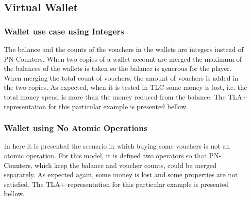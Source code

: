 \subsection{Virtual Wallet}\label{use_case_virtual_wallet}



\subsubsection{Wallet use case using Integers}
The balance and the counts of the vouchers in the wallets are integers instead of PN-Counters. When two copies of a wallet account are merged the maximum of the balances of the wallets is taken so the balance is generous for the player. When merging the total count of vouchers, the amount of vouchers is added in the two copies. As expected, when it is tested in TLC some money is lost, i.e. the total money spend is more than the money reduced from the balance. The TLA+ representation for this particular example is presented bellow.



\subsubsection{Wallet using No Atomic Operations}
In here it is presented the scenario in which buying some vouchers is not an atomic operation. For this model, it is defined two operators so that PN-Counters, which keep the balance and voucher counts, could be merged separately. As expected again, some money is lost and some properties are not satisfied. The TLA+ representation for this particular example is presented bellow.

